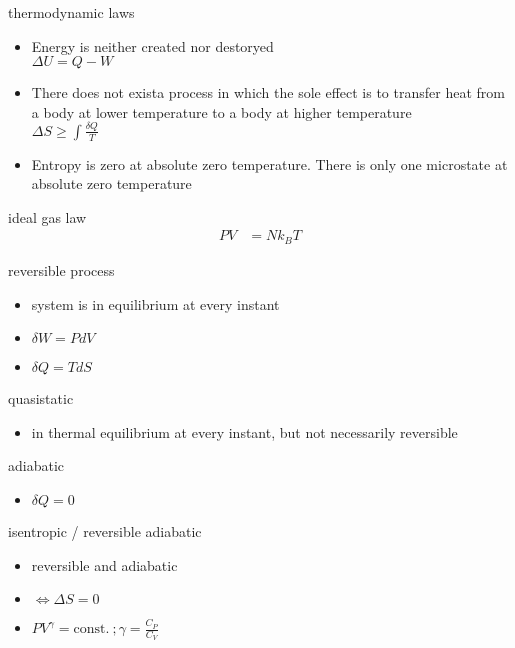\documentclass[avery5388, frame, grid]{flashcards}
\begin{document}
\begin{flashcard}{thermodynamic laws}
  \begin{itemize}
  \item Energy is neither created nor destoryed\\
    $\Delta U = Q - W$
  \item There does not exista  process in which the sole effect is to transfer heat from a
    body at lower temperature to a body at higher temperature\\
    $\Delta S \ge \int \frac{\delta Q}{T}$
  \item Entropy  is zero at absolute zero temperature. There is only one microstate at absolute
    zero temperature
  \end{itemize}
\end{flashcard}

\begin{flashcard}{ideal gas law}
  {
    \begin{align*}
      P V &= N k_{B} T
    \end{align*}
  }
\end{flashcard}

\begin{flashcard}{reversible process}
  \begin{itemize}
  \item system is in equilibrium at every instant
  \item $\delta W = P dV$
  \item $\delta Q = T dS$
  \end{itemize}
\end{flashcard}

\begin{flashcard}{quasistatic}
  \begin{itemize}
  \item in thermal equilibrium at every instant, but not necessarily reversible
  \end{itemize}
\end{flashcard}

\begin{flashcard}{adiabatic}
  \begin{itemize}
  \item $\delta Q = 0$
  \end{itemize}
\end{flashcard}

\begin{flashcard}{isentropic / reversible adiabatic}
  \begin{itemize}
  \item reversible and adiabatic
  \item $\iff \Delta S = 0$
  \item $PV^{\gamma} = \textrm{const.} \ ; \gamma = \frac{C_{P}}{C_{V}}$
  \end{itemize}
\end{flashcard}
\end{document}
